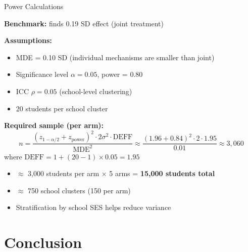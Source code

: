 \documentclass[aspectratio=169,11pt]{beamer}
\begin{document}
\begin{frame}{Power Calculations}

\textbf{Benchmark:} \citet{bergman2021information} finds 0.19 SD effect (joint treatment)

\bigskip

\textbf{Assumptions:}
\begin{itemize}
    \item MDE = 0.10 SD (individual mechanisms are smaller than joint)
    \item Significance level $\alpha = 0.05$, power = 0.80
    \item ICC $\rho = 0.05$ (school-level clustering)
    \item 20 students per school cluster
\end{itemize}

\bigskip

\textbf{Required sample (per arm):}
\[
n = \frac{(z_{1-\alpha/2} + z_{\text{power}})^2 \cdot 2\sigma^2 \cdot \text{DEFF}}{\text{MDE}^2}
\approx \frac{(1.96 + 0.84)^2 \cdot 2 \cdot 1.95}{0.01} \approx 3{,}060
\]
where $\text{DEFF} = 1 + (20-1) \times 0.05 = 1.95$

\bigskip

\begin{itemize}
    \item $\approx$ 3,000 students per arm $\times$ 5 arms = \textbf{15,000 students total}
    \item $\approx$ 750 school clusters (150 per arm)
    \item Stratification by school SES helps reduce variance
\end{itemize}

\end{frame}

\section{Conclusion}
\end{document}
